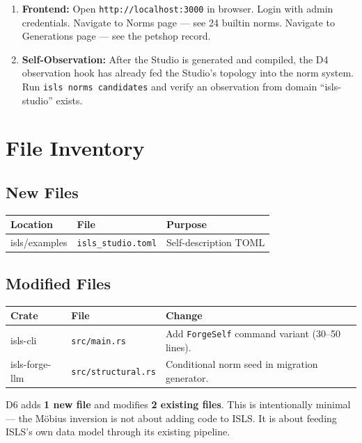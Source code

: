 \documentclass[11pt,a4paper]{article}
\begin{document}
\begin{enumerate}
\item \textbf{Frontend:}
      Open \texttt{http://localhost:3000} in browser.
      Login with admin credentials.
      Navigate to Norms page --- see 24 builtin norms.
      Navigate to Generations page --- see the petshop record.

\item \textbf{Self-Observation:}
      After the Studio is generated and compiled, the D4 observation
      hook has already fed the Studio's topology into the norm
      system. Run \texttt{isls norms candidates} and verify an
      observation from domain ``isls-studio'' exists.
\end{enumerate}


\section{File Inventory}

\subsection{New Files}

\begin{longtable}{llp{7cm}}
\toprule
\textbf{Location} & \textbf{File} & \textbf{Purpose} \\
\midrule
isls/examples & \texttt{isls\_studio.toml}
  & Self-description TOML \\
\bottomrule
\end{longtable}

\subsection{Modified Files}

\begin{longtable}{llp{7cm}}
\toprule
\textbf{Crate} & \textbf{File} & \textbf{Change} \\
\midrule
isls-cli & \texttt{src/main.rs}
  & Add \texttt{ForgeSelf} command variant (30--50 lines). \\
isls-forge-llm & \texttt{src/structural.rs}
  & Conditional norm seed in migration generator. \\
\bottomrule
\end{longtable}

D6 adds \textbf{1 new file} and modifies \textbf{2 existing files}.
This is intentionally minimal --- the M\"obius inversion is not about
adding code to ISLS. It is about feeding ISLS's own data model through
its existing pipeline.
\end{document}
